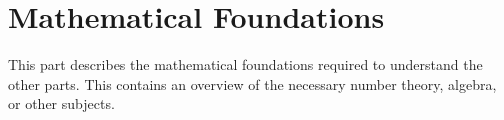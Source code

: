 \documentclass[../../main.tex]{subfiles}  %
\begin{document}
\chapterlayout
\chapter*{Mathematical Foundations}
This part describes the mathematical foundations required to understand the other parts. 
This contains an overview of the necessary number theory, algebra, or other subjects.
\end{document}
